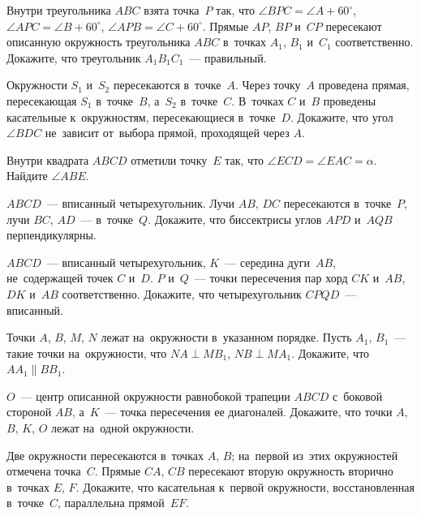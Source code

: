 \begin{problems}

\item
Внутри треугольника $ABC$ взята точка~$P$ так, что
$\angle BPC = \angle A + 60^{\circ}$,
$\angle APC = \angle B + 60^{\circ}$,
$\angle APB = \angle C + 60^{\circ}$.
Прямые $AP$, $BP$ и~$CP$ пересекают описанную окружность треугольника $ABC$
в~точках $A_1$, $B_1$ и~$C_1$ соответственно.
Докажите, что треугольник $A_1 B_1 C_1$~--- правильный.

\item
Окружности $S_1$ и~$S_2$ пересекаются в~точке~$A$.
Через точку~$A$ проведена прямая, пересекающая $S_1$ в~точке~$B$, а~$S_2$
в~точке~$C$.
В~точках $C$ и~$B$ проведены касательные к~окружностям, пересекающиеся
в~точке~$D$.
Докажите, что угол $\angle BDC$ не~зависит от~выбора прямой, проходящей
через $A$.

\item
Внутри квадрата $ABCD$ отметили точку~$E$ так, что
$\angle ECD = \angle EAC = \alpha$.
Найдите $\angle ABE$.

\item
$ABCD$~--- вписанный четырехугольник.
Лучи $AB$, $DC$ пересекаются в~точке~$P$, лучи $BC$, $AD$~--- в~точке~$Q$.
Докажите, что биссектрисы углов $APD$ и~$AQB$ перпендикулярны.

\item
$ABCD$~--- вписанный четырехугольник, $K$~--- середина дуги~$AB$,
не~содержащей точек $C$ и~$D$.
$P$ и~$Q$~--- точки пересечения пар хорд $CK$ и~$AB$, $DK$ и~$AB$
соответственно.
Докажите, что четырехугольник $CPQD$~--- вписанный.

\item
Точки $A$, $B$, $M$, $N$ лежат на~окружности в~указанном порядке.
Пусть $A_1$, $B_1$~--- такие точки на~окружности, что
$N A \perp M B_1$, $N B \perp M A_1$.
Докажите, что $A A_1 \parallel B B_1$.

\item
$O$~--- центр описанной окружности равнобокой трапеции $ABCD$ с~боковой
стороной $AB$, а~$K$~--- точка пересечения ее диагоналей.
Докажите, что точки $A$, $B$, $K$, $O$ лежат на~одной окружности.

\item
Две окружности пересекаются в~точках $A$, $B$;
на~первой из~этих окружностей отмечена точка~$C$.
Прямые $CA$, $CB$ пересекают вторую окружность вторично в~точках $E$, $F$.
Докажите, что касательная к~первой окружности, восстановленная в~точке~$C$,
параллельна прямой~$EF$.


\end{problems}
